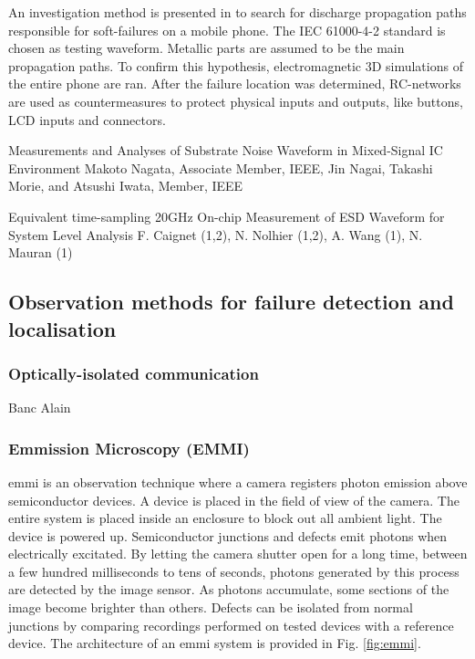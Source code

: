 An investigation method is presented in \cite{softFailMobile} to search for discharge propagation paths responsible for soft-failures on a mobile phone.
The IEC 61000-4-2 standard is chosen as testing waveform.
Metallic parts are assumed to be the main propagation paths.
To confirm this hypothesis, electromagnetic 3D simulations of the entire phone are ran.
After the failure location was determined, RC-networks are used as countermeasures to protect physical inputs and outputs, like buttons, LCD inputs and connectors.

Measurements and Analyses of Substrate Noise Waveform in Mixed-Signal IC Environment Makoto Nagata, Associate Member, IEEE, Jin Nagai, Takashi Morie, and Atsushi Iwata, Member, IEEE

Equivalent time-sampling
20GHz On-chip Measurement of ESD Waveform for System Level Analysis F. Caignet (1,2), N. Nolhier (1,2), A. Wang (1), N. Mauran (1)


\subsection{Observation methods for failure detection and localisation}

\subsubsection{Optically-isolated communication}

Banc Alain

\subsubsection{Emmission Microscopy (EMMI)}

\gls{emmi} is an observation technique where a camera registers photon emission above semiconductor devices.
A device is placed in the field of view of the camera.
The entire system is placed inside an enclosure to block out all ambient light.
The device is powered up.
Semiconductor junctions and defects emit photons when electrically excitated.
By letting the camera shutter open for a long time, between a few hundred milliseconds to tens of seconds, photons generated by this process are detected by the image sensor.
As photons accumulate, some sections of the image become brighter than others.
Defects can be isolated from normal junctions by comparing recordings performed on tested devices with a reference device.
The architecture of an \gls{emmi} system is provided in Fig. \ref{fig:emmi}.

